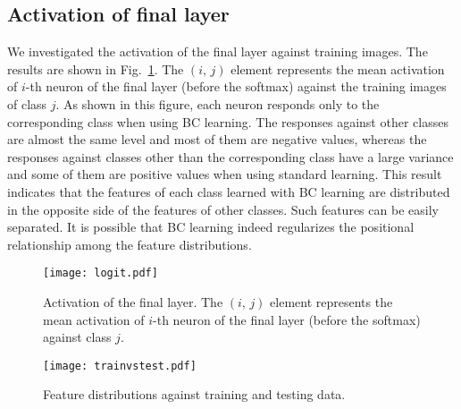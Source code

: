 \documentclass[10pt,twocolumn,letterpaper]{article}
\begin{document}
\subsection{Activation of final layer}
We investigated the activation of the final layer against training images. The results are shown in Fig.~\ref{fig:logit}. The $(i,\,j)$ element represents the mean activation of $i$-th neuron of the final layer (before the softmax) against the training images of class $j$. As shown in this figure, each neuron responds only to the corresponding class when using BC learning. The responses against other classes are almost the same level and most of them are negative values, whereas the responses against classes other than the corresponding class have a large variance and some of them are positive values when using standard learning. This result indicates that the features of each class learned with BC learning are distributed in the opposite side of the features of other classes. Such features can be easily separated. It is possible that BC learning indeed regularizes the positional relationship among the feature distributions. 

\begin{figure}
	\centering
	\texttt{[image: logit.pdf]}
	\vspace{-3mm}
	\caption{Activation of the final layer. The $(i,\,j)$ element represents the mean activation of $i$-th neuron of the final layer (before the softmax) against class $j$.}
	\label{fig:logit}
	\vspace{-2mm}
\end{figure}

\begin{figure}
	\centering
	\texttt{[image: trainvstest.pdf]}
	\vspace{-3mm}
	\caption{Feature distributions against training and testing data.}
	\label{fig:trainvstest}
	\vspace{-3mm}
\end{figure}
\end{document}
